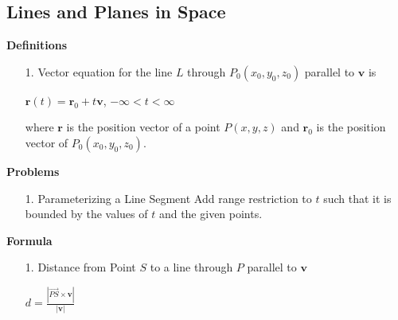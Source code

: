 \documentclass[10pt, twocolumn]{article}
\begin{document}
\subsection{Lines and Planes in Space}
{\bf Definitions}
\begin{enumerate}
\item[1.]{Vector equation for the line $L$ through $P_0(x_0,y_0,z_0)$ parallel to $\mathbf{v}$ is}
\begin{center}
$\mathbf{r}(t) = \mathbf{r}_0 + t\mathbf{v}$, \hspace{25pt} $-\infty < t < \infty$
\end{center}
where $\mathbf{r}$ is the position vector of a point $P(x,y,z)$ and $\mathbf{r}_0$ is the position vector of $P_0(x_0,y_0,z_0)$.
\end{enumerate}
{\bf Problems}
\begin{enumerate}
\item[1.]{Parameterizing a Line Segment}
\newline
Add range restriction to $t$ such that it is bounded by the values of $t$ and the given points.
\end{enumerate}
{\bf Formula}
\begin{enumerate}
\item[1.]{Distance from Point $S$ to a line through $P$ parallel to $\mathbf{v}$}
\begin{center}
$d = \frac{|\vec{PS} \times \mathbf{v}|}{|\mathbf{v}|}$
\end{center}
\end{enumerate}
\end{document}
